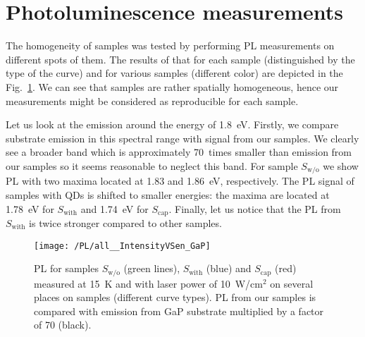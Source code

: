 \newpage
\section{Photoluminescence measurements}

The homogeneity of samples was tested by performing PL measurements on different spots of them. The results of that for each sample (distinguished by the type of the curve) and for various samples (different color) are depicted in the Fig.~\ref{fig:PL_homogenity}. We can see that samples are rather spatially homogeneous, hence our measurements might be considered as reproducible for each sample. %

Let us look at the emission around the energy of 1.8~eV. Firstly, we compare substrate emission in this spectral range with signal from our samples. We clearly see a broader band which is approximately 70~times smaller than emission from our samples so it seems reasonable to neglect this band. For sample $S_\mathrm{w/o}$ we show PL with two maxima located at 1.83 and 1.86~eV, respectively. The PL signal of samples with QDs is shifted to smaller energies: the maxima are located at 1.78~eV for $S_\mathrm{with}$ and 1.74~eV for $S_\mathrm{cap}$. Finally, let us notice that the PL from $S_\mathrm{with}$ is twice stronger compared to other samples.
\begin{figure}
	\centering
	\texttt{[image: /PL/all\_\_IntensityVSen\_GaP]}
	\caption{PL for samples $S_\mathrm{w/o}$ (green lines), $S_\mathrm{with}$ (blue) and $S_\mathrm{cap}$ (red) measured at 15~K and with laser power of 10~W/cm$^2$ on several places on samples (different curve types). PL from our samples is compared with emission from GaP substrate multiplied by a factor of 70 (black).}
	\label{fig:PL_homogenity}
\end{figure}

{}
		

